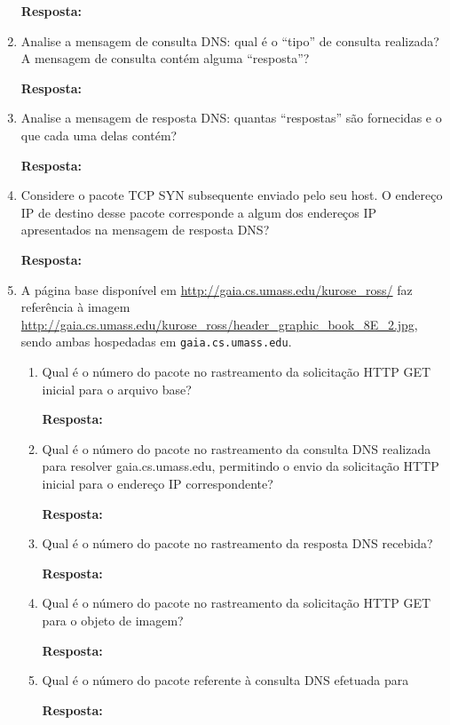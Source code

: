 \documentclass[12pt,a4paper]{report}
\begin{document}
\begin{enumerate}
		\textbf{Resposta:} 

		\item Analise a mensagem de consulta DNS: qual é o “tipo” de consulta realizada? A mensagem de consulta contém alguma “resposta”?
		
		\textbf{Resposta:}

		\item Analise a mensagem de resposta DNS: quantas “respostas” são fornecidas e o que cada uma delas contém?
		
		\textbf{Resposta:}

		\item Considere o pacote TCP SYN subsequente enviado pelo seu host. O endereço IP de destino desse pacote corresponde a algum dos endereços IP apresentados na mensagem de resposta DNS?
		
		\textbf{Resposta:}

		\item A página base disponível em \url{http://gaia.cs.umass.edu/kurose_ross/} faz referência à imagem \url{http://gaia.cs.umass.edu/kurose_ross/header_graphic_book_8E_2.jpg}, sendo ambas hospedadas em \texttt{gaia.cs.umass.edu}.
		
		\begin{enumerate}
			\item Qual é o número do pacote no rastreamento da solicitação HTTP GET inicial para o arquivo base?
			
			\textbf{Resposta:}

			\item Qual é o número do pacote no rastreamento da consulta DNS realizada para resolver gaia.cs.umass.edu, permitindo o envio da solicitação HTTP inicial para o endereço IP correspondente?
			
			\textbf{Resposta:}

			\item Qual é o número do pacote no rastreamento da resposta DNS recebida?
			
			\textbf{Resposta:}

			\item Qual é o número do pacote no rastreamento da solicitação HTTP GET para o objeto de imagem?
			
			\textbf{Resposta:}

			\item Qual é o número do pacote referente à consulta DNS efetuada para
			
			\textbf{Resposta:}
		\end{enumerate}


\end{enumerate}
\end{document}
